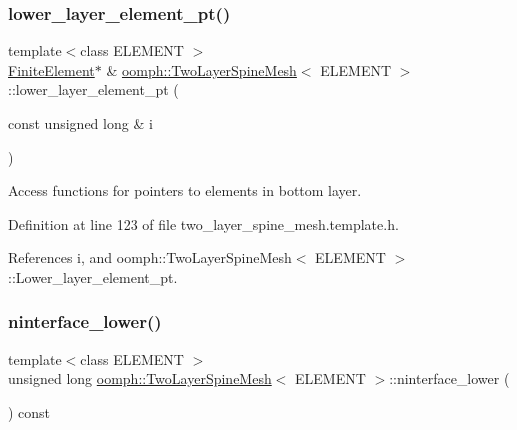 \subsubsection{\texorpdfstring{lower\+\_\+layer\+\_\+element\+\_\+pt()}{lower\_layer\_element\_pt()}}
{\footnotesize\ttfamily template$<$class E\+L\+E\+M\+E\+NT $>$ \\
\hyperlink{classoomph_1_1FiniteElement}{Finite\+Element}$\ast$ \& \hyperlink{classoomph_1_1TwoLayerSpineMesh}{oomph\+::\+Two\+Layer\+Spine\+Mesh}$<$ E\+L\+E\+M\+E\+NT $>$\+::lower\+\_\+layer\+\_\+element\+\_\+pt (\begin{DoxyParamCaption}\item[{const unsigned long \&}]{i }\end{DoxyParamCaption})\hspace{0.3cm}{\ttfamily [inline]}}



Access functions for pointers to elements in bottom layer. 



Definition at line 123 of file two\+\_\+layer\+\_\+spine\+\_\+mesh.\+template.\+h.



References i, and oomph\+::\+Two\+Layer\+Spine\+Mesh$<$ E\+L\+E\+M\+E\+N\+T $>$\+::\+Lower\+\_\+layer\+\_\+element\+\_\+pt.

\mbox{\label{classoomph_1_1TwoLayerSpineMesh_a5ad10a9a2022a32e2a5f311f789fae51}} 
\subsubsection{\texorpdfstring{ninterface\+\_\+lower()}{ninterface\_lower()}}
{\footnotesize\ttfamily template$<$class E\+L\+E\+M\+E\+NT $>$ \\
unsigned long \hyperlink{classoomph_1_1TwoLayerSpineMesh}{oomph\+::\+Two\+Layer\+Spine\+Mesh}$<$ E\+L\+E\+M\+E\+NT $>$\+::ninterface\+\_\+lower (\begin{DoxyParamCaption}{ }\end{DoxyParamCaption}) const\hspace{0.3cm}{\ttfamily [inline]}}



